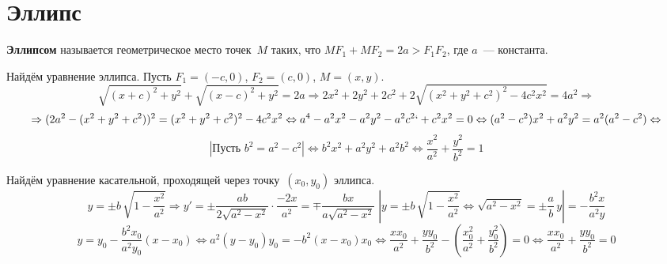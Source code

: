 \section{Эллипс}
 \textbf{Эллипсом} называется геометрическое место точек~$M$ таких, что $MF_1 + MF_2 = 2a > F_1 F_2$, где $a$~--- константа.

Найдём уравнение эллипса.
Пусть $F_1 = (-c, 0)$, $F_2 = (c, 0)$, $M = (x, y)$.
\begin{equation*}
\sqrt{(x + c)^2 + y^2} + \sqrt{(x - c)^2 + y^2} = 2a \Rightarrow
2x^2 + 2y^2 + 2c^2 + 2\sqrt{(x^2 + y^2 + c^2)^2 - 4c^2 x^2} = 4a^2 \Rightarrow
\end{equation*}
\begin{equation*}
\Rightarrow (2a^2 - (x^2 + y^2 + c^2))^2 = (x^2 + y^2 + c^2)^2 - 4c^2 x^2 \Leftrightarrow
a^4 - a^2 x^2 - a^2 y^2 - a^2 c^2`+ c^2 x^2 = 0 \Leftrightarrow
(a^2 - c^2) x^2 + a^2 y^2 = a^2 (a^2 - c^2) \Leftrightarrow
\end{equation*}
\begin{equation*}
\left|\text{Пусть $b^2 = a^2 - c^2$}\right|
\Leftrightarrow b^2 x^2 + a^2 y^2 + a^2 b^2 \Leftrightarrow
\frac{x^2}{a^2} + \frac{y^2}{b^2} = 1
\end{equation*}

Найдём уравнение касательной, проходящей через точку~$(x_0, y_0)$ эллипса.
\begin{equation*}
y = \pm b\,\sqrt{1 - \frac{x^2}{a^2}} \Rightarrow
y' = \pm\frac{ab}{2\sqrt{a^2 - x^2}} \cdot \frac{-2x}{a^2} =
\mp\frac{bx}{a\sqrt{a^2 - x^2}} \;
\left|y = \pm b\,\sqrt{1 - \frac{x^2}{a^2}} \Leftrightarrow
\sqrt{a^2 - x^2} = \pm\frac{a}b\,y\right| =
-\frac{b^2 x}{a^2 y}
\end{equation*}
\begin{equation*}
y = y_0 - \frac{b^2 x_0}{a^2 y_0} (x - x_0) \Leftrightarrow
a^2 (y - y_0) y_0 = -b^2 (x - x_0) x_0 \Leftrightarrow
\frac{x x_0}{a^2} + \frac{y y_0}{b^2} - \left(\frac{x_0^2}{a^2} + \frac{y_0^2}{b^2} \right) = 0 \Leftrightarrow
\frac{x x_0}{a^2} + \frac{y y_0}{b^2} = 0
\end{equation*}